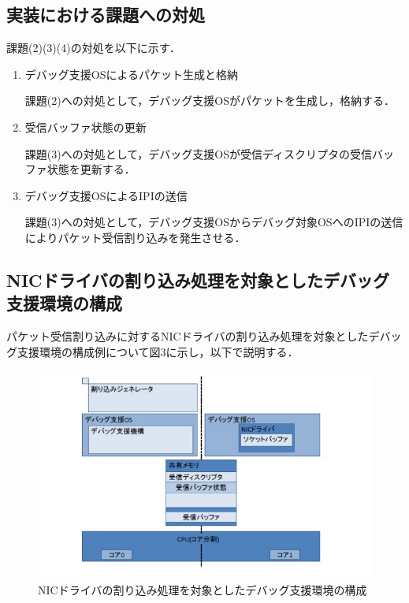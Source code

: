 \documentclass[12pt]{jsarticle}
\begin{document}
\subsection{実装における課題への対処}
課題(2)(3)(4)の対処を以下に示す．
\begin{enumerate}
\item デバッグ支援OSによるパケット生成と格納

課題(2)への対処として，デバッグ支援OSがパケットを生成し，格納する．
\item 受信バッファ状態の更新

課題(3)への対処として，デバッグ支援OSが受信ディスクリプタの受信バッファ状態を更新する．
\item デバッグ支援OSによるIPIの送信

課題(3)への対処として，デバッグ支援OSからデバッグ対象OSへのIPIの送信によりパケット受信割り込みを発生させる．
\end{enumerate}
\subsection{NICドライバの割り込み処理を対象としたデバッグ支援環境の構成}
パケット受信割り込みに対するNICドライバの割り込み処理を対象としたデバッグ支援環境の構成例について図3に示し，以下で説明する．


\begin{figure}[t]
\begin{center}
\includegraphics[height=7.0cm]{./fig3.jpg}          
\caption{NICドライバの割り込み処理を対象としたデバッグ支援環境の構成}
\label{fig:up}
\end{center}
\end{figure}
\end{document}
